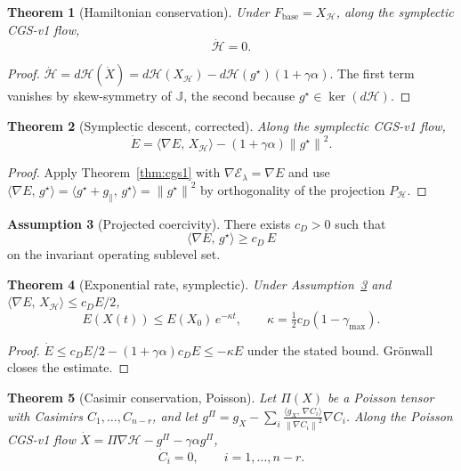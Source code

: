 \documentclass[11pt,a4paper]{article}
\newtheorem{theorem}{Theorem}[section]
\theoremstyle{definition}
\newtheorem{assumption}[theorem]{Assumption}
\newcommand{\Fbase}{F_{\mathrm{base}}}
\newcommand{\norm}[1]{\left\|#1\right\|}
\newcommand{\inner}[2]{\langle #1,\,#2\rangle}
\newcommand{\half}{\tfrac{1}{2}}
\begin{document}
\begin{theorem}[Hamiltonian conservation]
\label{thm:sp1}
Under $\Fbase = X_\mathcal{H}$, along the symplectic CGS-v1 flow,
\[
\dot{\mathcal{H}} = 0.
\]
\end{theorem}

\begin{proof}
$\dot{\mathcal{H}} = d\mathcal{H}(\dot X) = d\mathcal{H}(X_\mathcal{H}) - d\mathcal{H}(g^\star)(1 + \gamma\alpha)$. The first term vanishes by skew-symmetry of $\mathbb{J}$, the second because $g^\star \in \ker(d\mathcal{H})$.
\end{proof}

\begin{theorem}[Symplectic descent, corrected]
\label{thm:sp2}
Along the symplectic CGS-v1 flow,
\[
\dot E = \inner{\nabla E}{X_\mathcal{H}} - (1 + \gamma\alpha)\norm{g^\star}^2.
\]
\end{theorem}

\begin{proof}
Apply Theorem~\ref{thm:cgs1} with $\nabla \mathcal{E}_\lambda = \nabla E$ and use $\inner{\nabla E}{g^\star} = \inner{g^\star + g_\parallel}{g^\star} = \norm{g^\star}^2$ by orthogonality of the projection $P_\mathcal{H}$.
\end{proof}

\begin{assumption}[Projected coercivity]
\label{ass:projcoerc}
There exists $c_D > 0$ such that
\[
\inner{\nabla E}{g^\star} \geq c_D\, E
\]
on the invariant operating sublevel set.
\end{assumption}

\begin{theorem}[Exponential rate, symplectic]
\label{thm:sp3}
Under Assumption~\ref{ass:projcoerc} and $\inner{\nabla E}{X_\mathcal{H}} \leq c_D E /2$,
\[
E(X(t)) \leq E(X_0)\,e^{-\kappa t}, \qquad \kappa = \half c_D (1 - \gamma_{\max}).
\]
\end{theorem}

\begin{proof}
$\dot E \leq c_D E/2 - (1+\gamma\alpha) c_D E \leq -\kappa E$ under the stated bound. Grönwall closes the estimate.
\end{proof}

\begin{theorem}[Casimir conservation, Poisson]
\label{thm:sp4}
Let $\Pi(X)$ be a Poisson tensor with Casimirs $C_1,\dots,C_{n-r}$, and let $g^\Pi = g_X - \sum_i \frac{\inner{g_X}{\nabla C_i}}{\norm{\nabla C_i}^2}\nabla C_i$. Along the Poisson CGS-v1 flow $\dot X = \Pi \nabla \mathcal{H} - g^\Pi - \gamma\alpha g^\Pi$,
\[
\dot C_i = 0, \qquad i = 1,\dots,n-r.
\]
\end{theorem}
\end{document}
